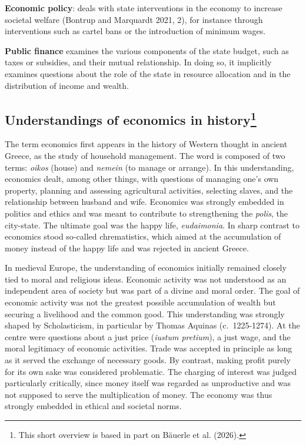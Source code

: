 \documentclass[
  british,
  a4paper,
  DIV=11,
  numbers=noendperiod,
  oneside,
  openany]{scrreprt}
\begin{document}
\begin{tcolorbox}
\textbf{Economic policy}: deals with state interventions in the economy
to increase societal welfare (Bontrup and Marquardt 2021, 2), for
instance through interventions such as cartel bans or the introduction
of minimum wages.

\textbf{Public finance} examines the various components of the state
budget, such as taxes or subsidies, and their mutual relationship. In
doing so, it implicitly examines questions about the role of the state
in resource allocation and in the distribution of income and wealth.

\end{tcolorbox}

\subsection[Understandings of economics in
history]{\texorpdfstring{Understandings of economics in
history\footnote{This short overview is based in part on Bäuerle et al.
  (2026).}}{Understandings of economics in history}}\label{understandings-of-economics-in-history1_intro-1}

The term economics first appears in the history of Western thought in
ancient Greece, as the study of household management. The word is
composed of two terms: \emph{oikos} (house) and \emph{nemein} (to manage
or arrange). In this understanding, economics dealt, among other things,
with questions of managing one's own property, planning and assessing
agricultural activities, selecting slaves, and the relationship between
husband and wife. Economics was strongly embedded in politics and ethics
and was meant to contribute to strengthening the \emph{polis}, the
city-state. The ultimate goal was the happy life, \emph{eudaimonia}. In
sharp contrast to economics stood so-called chrematistics, which aimed
at the accumulation of money instead of the happy life and was rejected
in ancient Greece.

In medieval Europe, the understanding of economics initially remained
closely tied to moral and religious ideas. Economic activity was not
understood as an independent area of society but was part of a divine
and moral order. The goal of economic activity was not the greatest
possible accumulation of wealth but securing a livelihood and the common
good. This understanding was strongly shaped by Scholasticism, in
particular by Thomas Aquinas (c.~1225-1274). At the centre were
questions about a just price (\emph{iustum pretium}), a just wage, and
the moral legitimacy of economic activities. Trade was accepted in
principle as long as it served the exchange of necessary goods. By
contrast, making profit purely for its own sake was considered
problematic. The charging of interest was judged particularly
critically, since money itself was regarded as unproductive and was not
supposed to serve the multiplication of money. The economy was thus
strongly embedded in ethical and societal norms.
\end{document}
